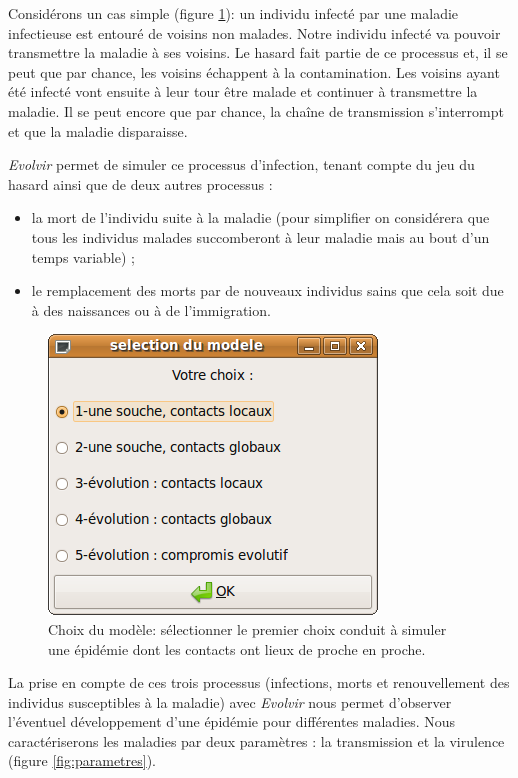 \documentclass[12pt]{article}
\begin{document}
Considérons un cas simple (figure \ref{fig:selecao}): un individu
infecté par une maladie infectieuse est entouré de voisins non
malades. Notre individu infecté va pouvoir transmettre la maladie à
ses voisins. Le hasard fait partie de ce processus et, il se peut que
par chance, les voisins échappent à la contamination. Les voisins
ayant été infecté vont ensuite à leur tour être malade et continuer à
transmettre la maladie. Il se peut encore que par chance, la chaîne de
transmission s'interrompt et que la maladie disparaisse.

\textit{Evolvir} permet de simuler ce processus d'infection, tenant
compte du jeu du hasard ainsi que de deux autres processus :
\begin{itemize}
\item la mort de l'individu suite à la maladie (pour simplifier on
  considérera que tous les individus malades succomberont à leur
  maladie mais au bout d'un temps variable) ;
\item le remplacement des morts par de nouveaux individus sains que
  cela soit due à des naissances ou à de l'immigration.
\end{itemize}

\begin{figure}[h!]
  \center
	\includegraphics[width=0.4\linewidth]{graph/selecao.png}
        \caption{Choix du modèle: sélectionner le premier choix
          conduit à simuler une épidémie dont les contacts ont lieux
          de proche en proche.}
\label{fig:selecao}
\end{figure}

La prise en compte de ces trois processus (infections, morts et
renouvellement des individus susceptibles à la maladie) avec
\textit{Evolvir} nous permet d'observer l'éventuel développement d'une
épidémie pour différentes maladies. Nous caractériserons les maladies
par deux paramètres : la transmission et la virulence (figure
\ref{fig:parametres}).
\end{document}
